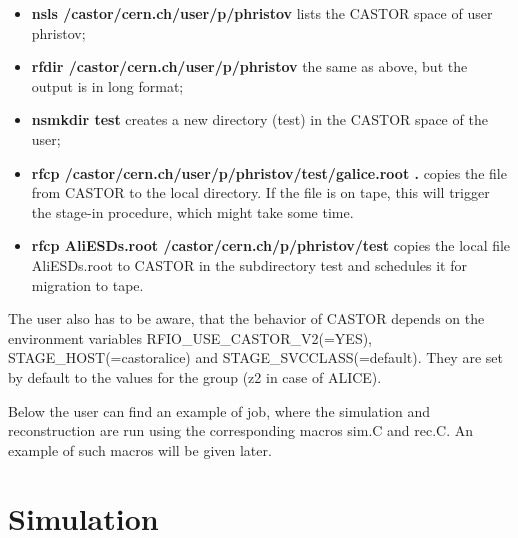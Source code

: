 \documentclass[12pt,a4paper,twoside]{article}
\begin{document}
\begin{itemize}
\item \textbf{nsls /castor/cern.ch/user/p/phristov} lists the CASTOR
  space of user phristov;
\item \textbf{rfdir /castor/cern.ch/user/p/phristov} the same as
  above, but the output is in long format;
\item \textbf{nsmkdir test} creates a new directory (test) in the
  CASTOR space of the user;
\item \textbf{rfcp /castor/cern.ch/user/p/phristov/test/galice.root .}
  copies the file from CASTOR to the local directory. If the file is
  on tape, this will trigger the stage-in procedure, which might take
  some time.
\item \textbf{rfcp AliESDs.root /castor/cern.ch/p/phristov/test}
  copies the local file AliESDs.root to CASTOR in the subdirectory
  test and schedules it for migration to tape.
\end{itemize}

The user also has to be aware, that the behavior of CASTOR depends on
the environment variables RFIO\_USE\_CASTOR\_V2(=YES),
STAGE\_HOST(=castoralice) and STAGE\_SVCCLASS(=default). They are set
by default to the values for the group (z2 in case of ALICE).

Below the user can find an example of job, where the simulation and
reconstruction are run using the corresponding macros sim.C and rec.C.
An example of such macros will be given later.




\newpage
\section{Simulation} \label{Simulation}

\end{document}
